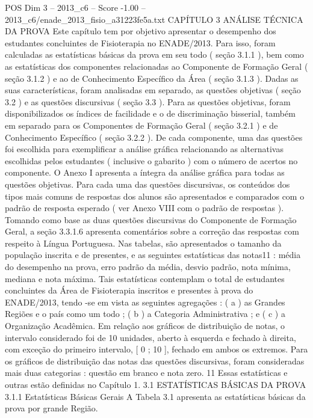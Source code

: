 \begin{textsample}{POS Dim 3 – 2013\_c6 – Score -1.00 – 2013\_c6/enade\_2013\_fisio\_a31223fe5a.txt}  \label{ex:f3_pos_228}
CAPÍTULO 3 ANÁLISE TÉCNICA DA PROVA Este capítulo tem por objetivo apresentar o desempenho dos estudantes concluintes de Fisioterapia no ENADE/2013.
Para isso, foram calculadas as estatísticas básicas da prova em seu todo ( seção 3.1.1 ), bem como as estatísticas dos componentes relacionadas ao Componente de Formação Geral ( seção 3.1.2 ) e ao de Conhecimento Específico da Área ( seção 3.1.3 ).
Dadas as suas características, foram analisadas em separado, as questões objetivas ( seção 3.2 ) e as questões discursivas ( seção 3.3 ).
Para as questões objetivas, foram disponibilizados os índices de facilidade e o de discriminação bisserial, também em separado para os Componentes de Formação Geral ( seção 3.2.1 ) e de Conhecimento Específico ( seção 3.2.2 ).
De cada componente, uma das questões foi escolhida para exemplificar a análise gráfica relacionando as alternativas escolhidas pelos estudantes ( inclusive o gabarito ) com o número de acertos no componente.
O Anexo I apresenta a íntegra da análise gráfica para todas as questões objetivas.
Para cada uma das questões discursivas, os conteúdos dos tipos mais comuns de respostas dos alunos são apresentados e comparados com o padrão de resposta esperado ( ver Anexo VIII com o padrão de respostas ).
Tomando como base as duas questões discursivas do Componente de Formação Geral, a seção 3.3.1.6 apresenta comentários sobre a correção das respostas com respeito à Língua Portuguesa.
Nas tabelas, são apresentados o tamanho da população inscrita e de presentes, e as seguintes estatísticas das notas11 : média do desempenho na prova, erro padrão da média, desvio padrão, nota mínima, mediana e nota máxima.
Tais estatísticas contemplam o total de estudantes concluintes da Área de Fisioterapia inscritos e presentes à prova do ENADE/2013, tendo -se em vista as seguintes agregações : ( a ) as Grandes Regiões e o país como um todo ; ( b ) a Categoria Administrativa ; e ( c ) a Organização Acadêmica.
Em relação aos gráficos de distribuição de notas, o intervalo considerado foi de 10 unidades, aberto à esquerda e fechado à direita, com exceção do primeiro intervalo, [ 0 ; 10 ], fechado em ambos os extremos.
Para os gráficos de distribuição das notas das questões discursivas, foram consideradas mais duas categorias : questão em branco e nota zero. 11 Essas estatísticas e outras estão definidas no Capítulo 1. 3.1 ESTATÍSTICAS BÁSICAS DA PROVA 3.1.1 Estatísticas Básicas Gerais A Tabela 3.1 apresenta as estatísticas básicas da prova por grande Região.

\end{textsample}
